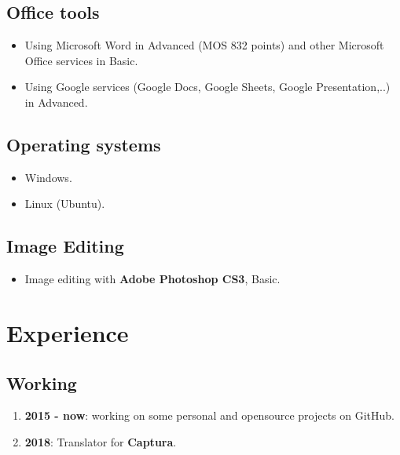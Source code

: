 \documentclass{article}
\begin{document}
        \subsection{Office tools}
        \begin{itemize}
            \item Using Microsoft Word in Advanced (MOS 832 points) and other Microsoft Office services in Basic.
            \item Using Google services (Google Docs, Google Sheets, Google Presentation,..) in Advanced.
        \end{itemize}

        \subsection{Operating systems}
        \begin{itemize}
            \item Windows.
            \item Linux (Ubuntu).
        \end{itemize}

        \subsection{Image Editing}
        \begin{itemize}
            \item Image editing with \textbf{Adobe Photoshop CS3}, Basic.
        \end{itemize}

    \section{Experience}
        \subsection{Working}
            \begin{enumerate}
                \item \textbf{2015 - now}: working on some personal and opensource projects on GitHub.
                \item \textbf{2018}: Translator for \textbf{Captura}\cite{Captura}.
            \end{enumerate}

\end{document}
